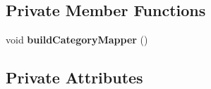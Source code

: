 \subsection*{Private Member Functions}
\begin{DoxyCompactItemize}
\item 
void {\bfseries build\+Category\+Mapper} ()\hypertarget{classcom_1_1example_1_1sebastian_1_1tindertp_1_1InterestsActivity_a942f695a3282a545d6d6a00af84fc715}{}\label{classcom_1_1example_1_1sebastian_1_1tindertp_1_1InterestsActivity_a942f695a3282a545d6d6a00af84fc715}

\end{DoxyCompactItemize}
\subsection*{Private Attributes}
